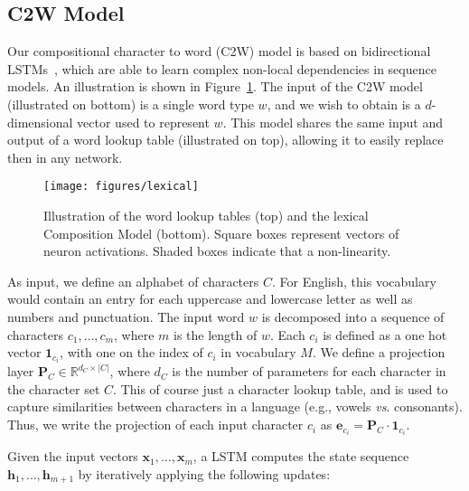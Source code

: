 \documentclass[11pt]{article}
\begin{document}
\begin{CJK*}{UTF8}{gbsn}
\section{C2W Model}

Our compositional character to word (C2W) model is based on bidirectional LSTMs~\cite{journals/nn/GravesS05}, which are able to learn complex non-local dependencies in sequence models. An illustration is shown in Figure~\ref{model}. The input of the C2W model (illustrated on bottom) is a single word type $w$, and we wish to obtain is a $d$-dimensional vector used to represent $w$. This model shares the same input and output of a word lookup table (illustrated on top), allowing it to easily replace then in any network.

\begin{figure}[ht]
\begin{center}
\centerline{\texttt{[image: figures/lexical]}}
\caption{Illustration of the word lookup tables (top) and the lexical Composition Model (bottom). Square boxes represent vectors of neuron activations. Shaded boxes indicate that a non-linearity. }
\label{model}
\end{center}
\end{figure} 


As input, we define an alphabet of characters $C$. For English, this vocabulary would contain an entry for each uppercase and lowercase letter as well as numbers and punctuation. The input word $w$ is decomposed into a sequence of characters $c_1,\ldots,c_m$, where $m$ is the length of $w$. Each $c_i$ is defined as a one hot vector $\mathbf{1}_{c_i}$, with one on the index of $c_i$ in vocabulary $M$. We define a projection layer $\mathbf{P}_C \in \mathbb{R}^{d_C \times |C|}$, where $d_C$ is the number of parameters for each character in the character set $C$. This of course just a character lookup table, and is used to capture similarities between characters in a language (e.g., vowels \emph{vs}. consonants). Thus, we write the projection of each input character $c_i$ as $\mathbf{e}_{c_i}=\mathbf{P}_C \cdot \mathbf{1}_{c_i}$.

Given the input vectors $\mathbf{x}_1,\ldots,\mathbf{x}_m$, a LSTM computes the state sequence $\mathbf{h}_1,\ldots,\mathbf{h}_{m+1}$ by iteratively applying the following updates:


\end{CJK*}
\end{document}
